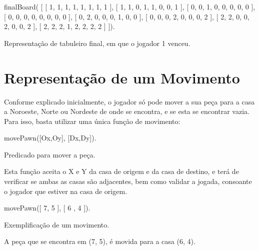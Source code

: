 \documentclass[15pt,a4paper]{article}
\begin{document}
\begin{code}[H]
	\begin{verbatimtab}

finalBoard(
	[
		[ 1, 1, 1, 1, 1, 1, 1, 1 ],
		[ 1, 1, 0, 1, 1, 0, 0, 1 ],
		[ 0, 0, 1, 0, 0, 0, 0, 0 ],
		[ 0, 0, 0, 0, 0, 0, 0, 0 ],
		[ 0, 2, 0, 0, 0, 1, 0, 0 ],
		[ 0, 0, 0, 2, 0, 0, 0, 2 ],
		[ 2, 2, 0, 0, 2, 0, 0, 2 ],
		[ 2, 2, 2, 1, 2, 2, 2, 2 ]
	]).
\end{verbatimtab}
\caption{Representação de tabuleiro final, em que o jogador 1 venceu.}
\end{code}



\section{Representação de um Movimento}


Conforme explicado inicialmente, o jogador só pode mover a sua peça para a casa a Noroeste, Norte ou Nordeste de onde se encontra, e se esta se encontrar vazia. Para isso, basta utilizar uma única função de movimento:
\begin{code}[H]
	\begin{verbatimtab}

	movePawn([Ox,Oy], [Dx,Dy]).
\end{verbatimtab}
\caption{Predicado para mover a peça.}
\end{code}
Esta função aceita o X e Y da casa de origem e da casa de destino, e terá de verificar se ambas as casas são adjacentes, bem como validar a jogada, consoante o jogador que estiver na casa de origem.

\begin{code}[H]
	\begin{verbatimtab}

	movePawn([ 7, 5 ], [ 6 , 4 ]).
\end{verbatimtab}
\caption{Exemplificação de um movimento.}
\end{code}
A peça que se encontra em (7, 5), é movida para a casa (6, 4).
\end{document}
